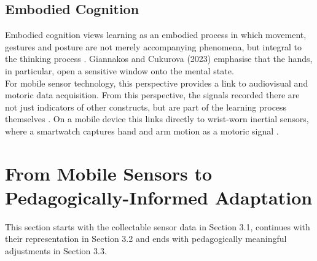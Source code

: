 \documentclass[runningheads]{llncs}
\begin{document}
\subsection{Embodied Cognition}

Embodied cognition views learning as an embodied process in which movement, gestures and posture are not merely accompanying phenomena, but integral to the thinking process \cite{giannakos_role_2023}. Giannakos and Cukurova (2023) emphasise that the hands, in particular, open a sensitive window onto the mental state.\\
For mobile sensor technology, this perspective provides a link to audiovisual and motoric data acquisition. From this perspective, the signals recorded there are not just indicators of other constructs, but are part of the learning process themselves \cite{di_mitri_signals_2018}.
On a mobile device this links directly to wrist-worn inertial sensors, where a smartwatch captures hand and arm motion as a motoric signal \cite{hong_advances_2025}.


\section{From Mobile Sensors to Pedagogically-Informed Adaptation}

This section starts with the collectable sensor data in Section 3.1, continues with their representation in Section 3.2 and ends with pedagogically meaningful adjustments in Section 3.3.

\end{document}
